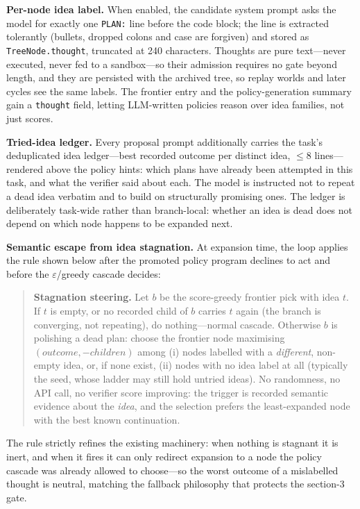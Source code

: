 \documentclass[11pt,a4paper]{article}
\newcommand{\hdr}[1]{\textbf{#1}}
\begin{document}
\hdr{Per-node idea label.} When enabled, the candidate system prompt asks the
model for exactly one \texttt{PLAN:} line before the code block; the line is
extracted tolerantly (bullets, dropped colons and case are forgiven) and
stored as \texttt{TreeNode.thought}, truncated at 240 characters. Thoughts are pure text---never executed, never fed to a sandbox---so
their admission requires no gate beyond length, and they are persisted with
the archived tree, so replay worlds and later cycles see the same labels.
The frontier entry and the policy-generation summary gain a \texttt{thought}
field, letting LLM-written policies reason over idea families, not just scores.

\hdr{Tried-idea ledger.} Every proposal prompt additionally carries the
task's deduplicated idea ledger---best recorded outcome per distinct idea,
$\leq$8 lines---rendered above the policy hints: which plans have already
been attempted in this task, and what the verifier said about each. The
model is instructed not to repeat a dead idea verbatim and to build on
structurally promising ones. The ledger is deliberately task-wide rather
than branch-local: whether an idea is dead does not depend on which node
happens to be expanded next.

\hdr{Semantic escape from idea stagnation.} At expansion time, the loop
applies the rule shown below after the promoted policy program declines to
act and before the $\varepsilon$/greedy cascade decides:

\begin{quote}\small\begin{minipage}{0.94\linewidth}
\textbf{Stagnation steering.} Let $b$ be the score-greedy frontier pick with
idea $t$. If $t$ is empty, or no recorded child of $b$ carries $t$ again
(the branch is converging, not repeating), do nothing---normal cascade.
Otherwise $b$ is polishing a dead plan: choose the frontier node
maximising $(\mathit{outcome}, -\mathit{children})$ among (i) nodes labelled
with a \emph{different}, non-empty idea, or, if none exist, (ii) nodes with
no idea label at all (typically the seed, whose ladder may still hold
untried ideas). No randomness, no API call, no verifier score improving:
the trigger is recorded semantic evidence about the \emph{idea}, and the
selection prefers the least-expanded node with the best known continuation.
\end{minipage}\end{quote}

The rule strictly refines the existing machinery: when nothing is stagnant
it is inert, and when it fires it can only redirect expansion to a node the
policy cascade was already allowed to choose---so the worst outcome of a
mislabelled thought is neutral, matching the fallback philosophy that
protects the section-3 gate.
\end{document}
